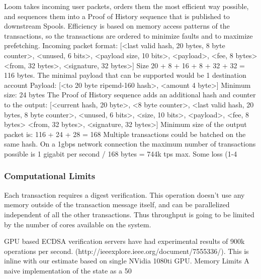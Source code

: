 \documentclass[12pt]{article}
\begin{document}
Loom takes incoming user packets, orders them the most efficient way possible, and sequences them into a Proof of History sequence that is published to downstream Spools.  Efficiency is based on memory access patterns of the transactions, so the transactions are ordered to minimize faults and to maximize prefetching.
Incoming packet format:
[<last valid hash, 20 bytes, 8 byte counter>, <unused, 6 bits>, <payload size, 10 bits>, <payload>, <fee, 8 bytes> <from, 32 bytes>, <signature, 32 bytes>]
Size 20 + 8 + 16 + 8 + 32 + 32 = 116 bytes.  The minimal payload that can be supported would be 1 destination account
Payload: 
[<to 20 byte ripemd-160 hash>, <amount 4 byte>]
Minimum size: 24 bytes
The Proof of History sequence adds an additional hash and counter to the output: 
[<current hash, 20 byte>, <8 byte counter>, <last valid hash, 20 bytes, 8 byte counter>, <unused, 6 bits>, <size, 10 bits>, <payload>, <fee, 8 bytes> <from, 32 bytes>, <signature, 32 bytes>]
Minimum size of the output packet is: 116 + 24 + 28 = 168
Multiple transactions could be batched on the same hash.  On a 1gbps network connection the maximum number of transactions possible is 1 gigabit per second / 168 bytes = 744k tps max.  Some loss (1-4%
\subsubsection{Computational Limits}
Each transaction requires a digest verification.  This operation doesn’t use any memory outside of the transaction message itself, and can be parallelized independent of all the other transactions.  Thus throughput is going to be limited by the number of cores available on the system.

GPU based ECDSA verification servers have had experimental results of 900k operations per second.  (http://ieeexplore.ieee.org/document/7555336/).  This is inline with our estimate based on single NVidia 1080ti GPU. 
Memory Limits
A naive implementation of the state as a 50%
\end{document}

